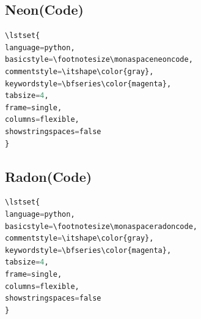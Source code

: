 \documentclass[a4paper]{scrartcl}
\begin{document}




\pagebreak

\subsection{Neon(Code)}

\begin{lstlisting}[language=python,basicstyle=\footnotesize\monaspaceneoncode,commentstyle=\itshape\color{gray},keywordstyle=\bfseries\color{magenta},tabsize=4,frame=single,columns=flexible,showstringspaces=false]
\lstset{
language=python,
basicstyle=\footnotesize\monaspaceneoncode,
commentstyle=\itshape\color{gray},
keywordstyle=\bfseries\color{magenta},
tabsize=4,
frame=single,
columns=flexible,
showstringspaces=false
}
\end{lstlisting}





\pagebreak

\subsection{Radon(Code)}

\begin{lstlisting}[language=python,basicstyle=\footnotesize\monaspaceradoncode,commentstyle=\itshape\color{gray},keywordstyle=\bfseries\color{magenta},tabsize=4,frame=single,columns=flexible,showstringspaces=false]
\lstset{
language=python,
basicstyle=\footnotesize\monaspaceradoncode,
commentstyle=\itshape\color{gray},
keywordstyle=\bfseries\color{magenta},
tabsize=4,
frame=single,
columns=flexible,
showstringspaces=false
}
\end{lstlisting}
\end{document}
